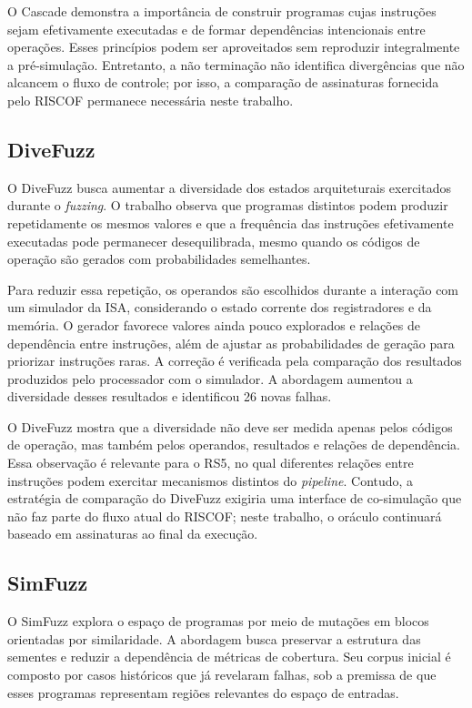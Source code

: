 O Cascade demonstra a importância de construir programas cujas instruções sejam efetivamente executadas e de formar dependências intencionais entre operações. Esses princípios podem ser aproveitados sem reproduzir integralmente a pré-simulação. Entretanto, a não terminação não identifica divergências que não alcancem o fluxo de controle; por isso, a comparação de assinaturas fornecida pelo RISCOF permanece necessária neste trabalho.

\subsection{DiveFuzz}\label{sec:divefuzz}

O DiveFuzz \citep{Guo:2025:DiveFuzz} busca aumentar a diversidade dos estados arquiteturais exercitados durante o \textit{fuzzing}. O trabalho observa que programas distintos podem produzir repetidamente os mesmos valores e que a frequência das instruções efetivamente executadas pode permanecer desequilibrada, mesmo quando os códigos de operação são gerados com probabilidades semelhantes.

Para reduzir essa repetição, os operandos são escolhidos durante a interação com um simulador da ISA, considerando o estado corrente dos registradores e da memória. O gerador favorece valores ainda pouco explorados e relações de dependência entre instruções, além de ajustar as probabilidades de geração para priorizar instruções raras. A correção é verificada pela comparação dos resultados produzidos pelo processador com o simulador. A abordagem aumentou a diversidade desses resultados e identificou 26 novas falhas.

O DiveFuzz mostra que a diversidade não deve ser medida apenas pelos códigos de operação, mas também pelos operandos, resultados e relações de dependência. Essa observação é relevante para o RS5, no qual diferentes relações entre instruções podem exercitar mecanismos distintos do \textit{pipeline}. Contudo, a estratégia de comparação do DiveFuzz exigiria uma interface de co-simulação que não faz parte do fluxo atual do RISCOF; neste trabalho, o oráculo continuará baseado em assinaturas ao final da execução.

\subsection{SimFuzz}\label{sec:simfuzz}

O SimFuzz \citep{Lyu:2026:SimFuzz} explora o espaço de programas por meio de mutações em blocos orientadas por similaridade. A abordagem busca preservar a estrutura das sementes e reduzir a dependência de métricas de cobertura. Seu corpus inicial é composto por casos históricos que já revelaram falhas, sob a premissa de que esses programas representam regiões relevantes do espaço de entradas.

